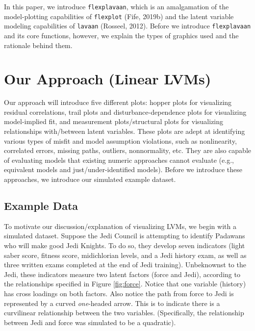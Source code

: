 \documentclass[
  english,
  man]{apa6}
\begin{document}
In this paper, we introduce \texttt{flexplavaan}, which is an amalgamation of the model-plotting capabilities of \texttt{flexplot} (Fife, 2019b) and the latent variable modeling capabilities of \texttt{lavaan} (Rosseel, 2012). Before we introduce \texttt{flexplavaan} and its core functions, however, we explain the types of graphics used and the rationale behind them.

\hypertarget{our-approach-linear-lvms}{%
\section{Our Approach (Linear LVMs)}\label{our-approach-linear-lvms}}

Our approach will introduce five different plots: hopper plots for visualizing residual correlations, trail plots and disturbance-dependence plots for visualizing model-implied fit, and measurement plots/structural plots for visualizing relationships with/between latent variables. These plots are adept at identifying various types of misfit and model assumption violations, such as nonlinearity, correlated errors, missing paths, outliers, nonnormality, etc. They are also capable of evaluating models that existing numeric approaches cannot evaluate (e.g., equivalent models and just/under-identified models). Before we introduce these approaches, we introduce our simulated example dataset.

\hypertarget{example-data}{%
\subsection{Example Data}\label{example-data}}

To motivate our discussion/explanation of visualizing LVMs, we begin with a simulated dataset. Suppose the Jedi Council is attempting to identify Padawans who will make good Jedi Knights. To do so, they develop seven indicators (light saber score, fitness score, midichlorian levels, and a Jedi history exam, as well as three written exams completed at the end of Jedi training). Unbeknownst to the Jedi, these indicators measure two latent factors (force and Jedi), according to the relationships specified in Figure \ref{fig:force}. Notice that one variable (history) has cross loadings on both factors. Also notice the path from force to Jedi is represented by a curved \emph{one}-headed arrow. This is to indicate there is a curvilinear relationship between the two variables. (Specifically, the relationship between Jedi and force was simulated to be a quadratic).
\end{document}

